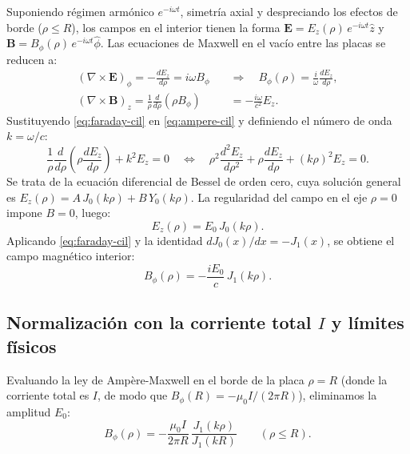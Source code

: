 \documentclass[11pt]{article}
\begin{document}
Suponiendo régimen armónico $e^{-i\omega t}$, simetría axial y despreciando los efectos de borde ($\rho \le R$), los campos en el interior tienen la forma $\mathbf{E} = E_z(\rho)\,e^{-i\omega t}\hat{z}$ y $\mathbf{B} = B_\phi(\rho)\,e^{-i\omega t}\hat{\phi}$. Las ecuaciones de Maxwell en el vacío entre las placas se reducen a:
\begin{align}
    (\nabla \times \mathbf{E})_\phi = -\frac{dE_z}{d\rho} = i\omega B_\phi \quad &\Longrightarrow \quad B_\phi(\rho) = \frac{i}{\omega} \frac{dE_z}{d\rho}, \label{eq:faraday-cil} \\
    (\nabla \times \mathbf{B})_z = \frac{1}{\rho} \frac{d}{d\rho}\left( \rho B_\phi \right) &= -\frac{i\omega}{c^2} E_z. \label{eq:ampere-cil}
\end{align}
Sustituyendo \eqref{eq:faraday-cil} en \eqref{eq:ampere-cil} y definiendo el número de onda $k = \omega / c$:
\begin{equation}
    \frac{1}{\rho} \frac{d}{d\rho}\left( \rho \frac{dE_z}{d\rho} \right) + k^2 E_z = 0 \quad \Longleftrightarrow \quad \rho^2 \frac{d^2 E_z}{d\rho^2} + \rho \frac{dE_z}{d\rho} + (k\rho)^2 E_z = 0.
\end{equation}
Se trata de la ecuación diferencial de Bessel de orden cero, cuya solución general es $E_z(\rho) = A\,J_0(k\rho) + B\,Y_0(k\rho)$. La regularidad del campo en el eje $\rho = 0$ impone $B = 0$, luego:
\begin{equation}
    E_z(\rho) = E_0\,J_0(k\rho).
\end{equation}
Aplicando \eqref{eq:faraday-cil} y la identidad $dJ_0(x)/dx = -J_1(x)$, se obtiene el campo magnético interior:
\begin{equation}
    B_\phi(\rho) = -\frac{i E_0}{c}\,J_1(k\rho).
\end{equation}

\subsection{Normalización con la corriente total $I$ y límites físicos}

Evaluando la ley de Ampère-Maxwell en el borde de la placa $\rho = R$ (donde la corriente total es $I$, de modo que $B_\phi(R) = -\mu_0 I / (2\pi R)$), eliminamos la amplitud $E_0$:
\begin{equation}
    B_\phi(\rho) = -\frac{\mu_0 I}{2\pi R}\,\frac{J_1(k\rho)}{J_1(kR)} \qquad (\rho \le R).
    \label{eq:bessel-B}
\end{equation}
\end{document}
